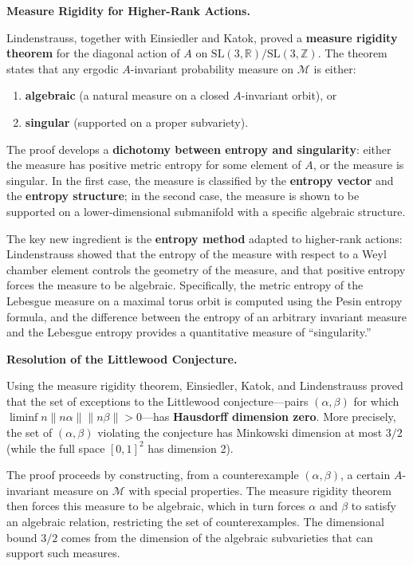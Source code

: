 \textbf{Measure Rigidity for Higher-Rank Actions.}

Lindenstrauss, together with Einsiedler and Katok, proved a \textbf{measure rigidity theorem} for the diagonal action of $A$ on $\text{SL}(3,\mathbb{R})/\text{SL}(3,\mathbb{Z})$. The theorem states that any ergodic $A$-invariant probability measure on $\mathcal{M}$ is either:

\begin{enumerate}
  \item \textbf{algebraic} (a natural measure on a closed $A$-invariant orbit), or
  \item \textbf{singular} (supported on a proper subvariety).
\end{enumerate}

The proof develops a \textbf{dichotomy between entropy and singularity}: either the measure has positive metric entropy for some element of $A$, or the measure is singular. In the first case, the measure is classified by the \textbf{entropy vector} and the \textbf{entropy structure}; in the second case, the measure is shown to be supported on a lower-dimensional submanifold with a specific algebraic structure.

The key new ingredient is the \textbf{entropy method} adapted to higher-rank actions: Lindenstrauss showed that the entropy of the measure with respect to a Weyl chamber element controls the geometry of the measure, and that positive entropy forces the measure to be algebraic. Specifically, the metric entropy of the Lebesgue measure on a maximal torus orbit is computed using the Pesin entropy formula, and the difference between the entropy of an arbitrary invariant measure and the Lebesgue entropy provides a quantitative measure of ``singularity.''

\textbf{Resolution of the Littlewood Conjecture.}

Using the measure rigidity theorem, Einsiedler, Katok, and Lindenstrauss \cite{lindenstrauss2008} proved that the set of exceptions to the Littlewood conjecture---pairs $(\alpha,\beta)$ for which $\liminf n\|n\alpha\| \|n\beta\| > 0$---has \textbf{Hausdorff dimension zero}. More precisely, the set of $(\alpha,\beta)$ violating the conjecture has Minkowski dimension at most $3/2$ (while the full space $[0,1]^2$ has dimension 2).

The proof proceeds by constructing, from a counterexample $(\alpha,\beta)$, a certain $A$-invariant measure on $\mathcal{M}$ with special properties. The measure rigidity theorem then forces this measure to be algebraic, which in turn forces $\alpha$ and $\beta$ to satisfy an algebraic relation, restricting the set of counterexamples. The dimensional bound $3/2$ comes from the dimension of the algebraic subvarieties that can support such measures.

